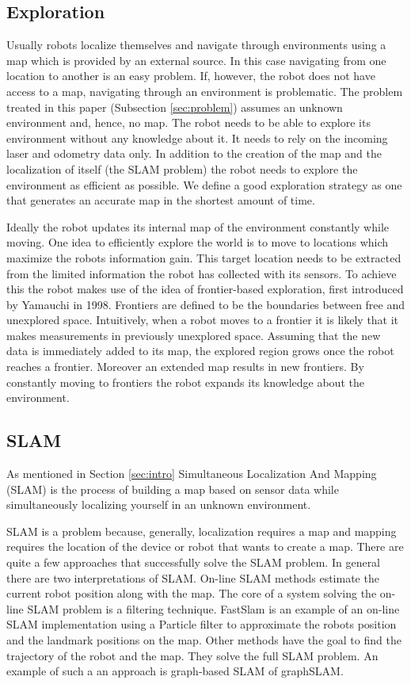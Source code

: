 \documentclass{ba-kecs}
\begin{document}
\subsection{Exploration}
\label{subsec:sotaExplore}
Usually robots localize themselves and navigate through environments using a map which is provided by an external source. In this case navigating from one location to another is an easy problem. If, however, the robot does not have access to a map, navigating through an environment is problematic. The problem treated in this paper (Subsection \ref{sec:problem}) assumes an unknown environment and, hence, no map. The robot needs to be able to explore its environment without any knowledge about it. It needs to rely on the incoming laser and odometry data only. In addition to the creation of the map and the localization of itself (the SLAM problem) the robot needs to explore the environment as efficient as possible. We define a good exploration strategy as one that generates an accurate map in the shortest amount of time.

Ideally the robot updates its internal map of the environment constantly while moving. One idea to efficiently explore the world is to move to locations which maximize the robots information gain. This target location needs to be extracted from the limited information the robot has collected with its sensors.
To achieve this the robot makes use of the idea of frontier-based exploration, first introduced by Yamauchi \cite{Yamauchi} in 1998. Frontiers are defined to be the boundaries between free and unexplored space. Intuitively, when a robot moves to a frontier it is likely that it makes measurements in previously unexplored space. Assuming that the new data is immediately added to its map, the explored region grows once the robot reaches a frontier. Moreover an extended map results in new frontiers. By constantly moving to frontiers the robot expands its knowledge about the environment.

\subsection{SLAM}
\label{subsec:sotaSlam}
As mentioned in Section \ref{sec:intro} Simultaneous Localization And Mapping (SLAM) is the process of building a map based on sensor data while simultaneously localizing yourself in an unknown environment.

SLAM is a problem because, generally, localization requires a map and mapping requires the location of the device or robot that wants to create a map. There are quite a few approaches that successfully solve the SLAM problem. In general there are two interpretations of SLAM. On-line SLAM methods estimate the current robot position along with the map. The core of a system solving the on-line SLAM problem is a filtering technique. FastSlam \citep{Montemerlo02} is an example of an on-line SLAM implementation using a Particle filter to approximate the robots position and the landmark positions on the map. Other methods have the goal to find the trajectory of the robot and the map. They solve the full SLAM problem.   
An example of such a an approach is graph-based SLAM of graphSLAM.
\end{document}
